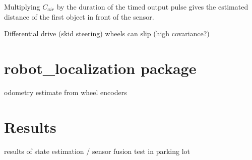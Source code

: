 Multiplying \(C_{air}\) by the duration of the timed output pulse gives the estimated distance of the first object in front of the sensor.

Differential drive (skid steering)
wheels can slip
 (high covariance?)


\section{robot\_localization package}
odometry estimate from wheel encoders


\cite{robot_localization_paper}

\section{Results}
results of state estimation / sensor fusion test in parking lot